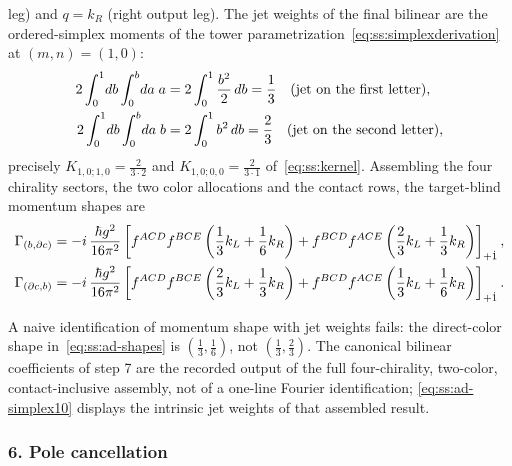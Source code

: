 leg) and $q=k_{R}$ (right output leg). The jet weights of the final bilinear
are the ordered-simplex moments of the tower
parametrization~\eqref{eq:ss:simplexderivation} at $(m,n)=(1,0)$:
\begin{align}
2\int_{0}^{1}\!db\int_{0}^{b}\!da\;a
&=2\int_{0}^{1}\frac{b^{2}}{2}\,db=\frac13
\quad(\text{jet on the first letter}),\notag\\
2\int_{0}^{1}\!db\int_{0}^{b}\!da\;b
&=2\int_{0}^{1}b^{2}\,db=\frac23
\quad(\text{jet on the second letter}),
\label{eq:ss:ad-simplex10}
\end{align}
precisely $K_{1,0;1,0}=\frac{2}{3\cdot2}$ and $K_{1,0;0,0}=\frac{2}{3\cdot1}$
of~\eqref{eq:ss:kernel}. Assembling the four chirality sectors, the two color
allocations and the contact rows, the target-blind momentum shapes are
\begin{align}
\Gamma_{(b,\partial c)}
&=-i\,\frac{\hbar g^{2}}{16\pi^{2}}\left[
f^{ACD}f^{BCE}\left(\frac13k_{L}+\frac16k_{R}\right)
+f^{BCD}f^{ACE}\left(\frac23k_{L}+\frac13k_{R}\right)\right]_{+\dot1},\notag\\
\Gamma_{(\partial c,b)}
&=-i\,\frac{\hbar g^{2}}{16\pi^{2}}\left[
f^{ACD}f^{BCE}\left(\frac23k_{L}+\frac13k_{R}\right)
+f^{BCD}f^{ACE}\left(\frac13k_{L}+\frac16k_{R}\right)\right]_{+\dot1}.
\label{eq:ss:ad-shapes}
\end{align}

\begin{remark}%
\label{rem:ss:ad-fourier}
A naive identification of momentum shape with jet weights fails: the
direct-color shape in~\eqref{eq:ss:ad-shapes} is $(\tfrac13,\tfrac16)$, not
$(\tfrac13,\tfrac23)$. The canonical bilinear coefficients of step 7 are the
recorded output of the full four-chirality, two-color, contact-inclusive
assembly, not of a one-line Fourier identification;
\eqref{eq:ss:ad-simplex10} displays the intrinsic jet weights of that
assembled result.
\end{remark}

\subsubsection*{6. Pole cancellation}

